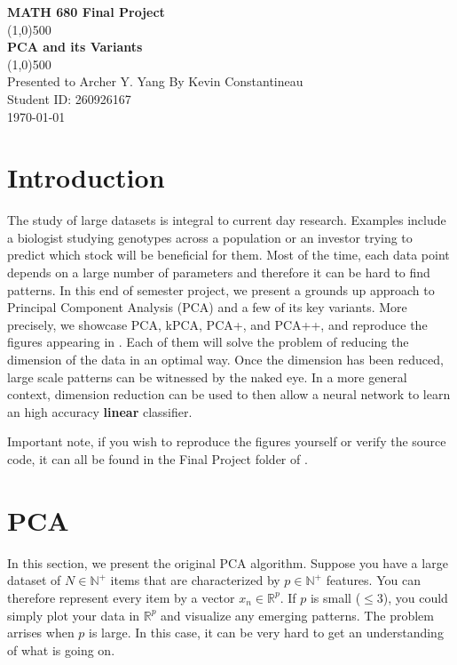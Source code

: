 \documentclass[12pt]{article}
\newcommand{\R}{\mathbb{R}}
\newcommand{\N}{\mathbb{N}}
\begin{document}
\begin{titlepage}
\begin{center}
\vspace*{1cm}
\huge{\textbf{MATH 680 Final Project}}\\
\vfill
\line(1,0){500}\\[1mm]
\huge{\textbf{PCA and its Variants}}\\
\line(1,0){500}\\
\vfill
Presented to Archer Y. Yang
\vfill
By Kevin Constantineau\\
Student ID: 260926167 \\
\today\\
\end{center}
\end{titlepage}

\section{Introduction}
The study of large datasets is integral to current day research. Examples include a biologist studying genotypes across a population or an investor trying to predict which stock will be beneficial for them. Most of the time, each data point depends on a large number of parameters and therefore it can be hard to find patterns. In this end of semester project, we present a grounds up approach to Principal Component Analysis (PCA) and a few of its key variants. More precisely, we showcase PCA, kPCA, PCA+, and PCA++, and reproduce the figures appearing in \cite{wu2025pcauniformityinducesrobustness}. Each of them will solve the problem of reducing the dimension of the data in an optimal way. Once the dimension has been reduced, large scale patterns can be witnessed by the naked eye. In a more general context, dimension reduction can be used to then allow a neural network to learn an high accuracy \textbf{linear} classifier.

Important note, if you wish to reproduce the figures yourself or verify the source code, it can all be found in the Final Project folder of \cite{Constantineau_MATH_680_Code}.


\section{PCA} \label{sec: PCA}
In this section, we present the original PCA algorithm. Suppose you have a large dataset of $N \in \N^+$ items that are characterized by $p \in \N^+$ features. You can therefore represent every item by a vector $x_n \in \R^p$. If $p$ is small ($\leq 3$), you could simply plot your data in $\R^p$ and visualize any emerging patterns. The problem arrises when $p$ is large. In this case, it can be very hard to get an understanding of what is going on.
\end{document}
